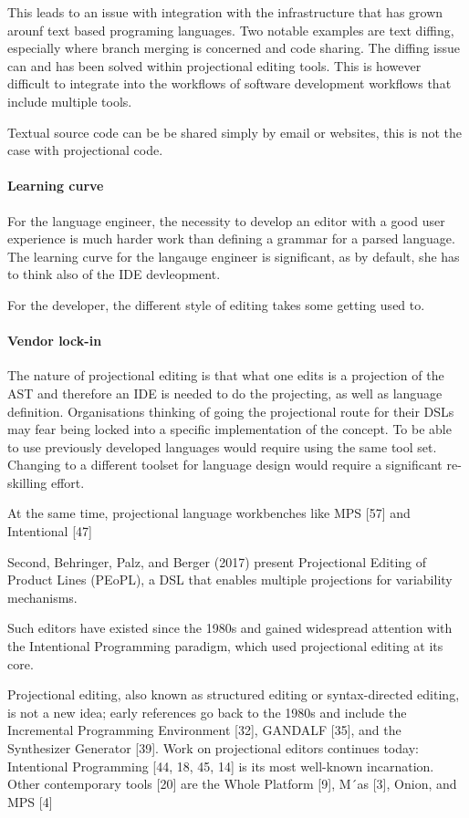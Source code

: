 This leads to an issue with integration with the infrastructure that has grown arounf text based programing languages.
Two notable examples are text diffing, especially where branch merging is concerned and code sharing.
The diffing issue can and has been solved within projectional editing tools.
This is however difficult to integrate into the workflows of software development workflows that include multiple tools.

Textual source code can be be shared simply by email or websites, this is not the case with projectional code.

\paragraph{Learning curve}
For the language engineer, the necessity to develop an editor with a good user experience is much harder work than defining a grammar for a parsed language.
The learning curve for the langauge engineer is significant, as by default, she has to think also of the IDE devleopment.

For the developer, the different style of editing takes some getting used to.

\paragraph{Vendor lock-in}
The nature of projectional editing is that what one edits is a projection of the AST and therefore an IDE is needed to do the projecting, as well as language definition.
Organisations thinking of going the projectional route for their DSLs may fear being locked into a specific implementation of the concept.
To be able to use previously developed languages would require using the same tool set. 
Changing to a different toolset for language design would require a significant re-skilling effort.


At the same time, projectional language workbenches like MPS [57] and Intentional [47]

Second, Behringer, Palz, and Berger (2017) present Projectional Editing of Product Lines (PEoPL), a DSL that enables multiple projections for variability mechanisms.

Such editors have existed since the 1980s and gained widespread attention with the Intentional Programming paradigm, which used projectional editing at its core.

Projectional editing, also known as structured editing or syntax-directed editing, is not a new idea; early references go back to the 1980s and include the Incremental Programming Environment [32], GANDALF [35], and the Synthesizer Generator [39].
Work on projectional editors continues today: Intentional Programming [44, 18, 45, 14] is its most well-known incarnation.
Other contemporary tools [20] are the Whole Platform [9], M´as [3], Onion, and MPS [4]

